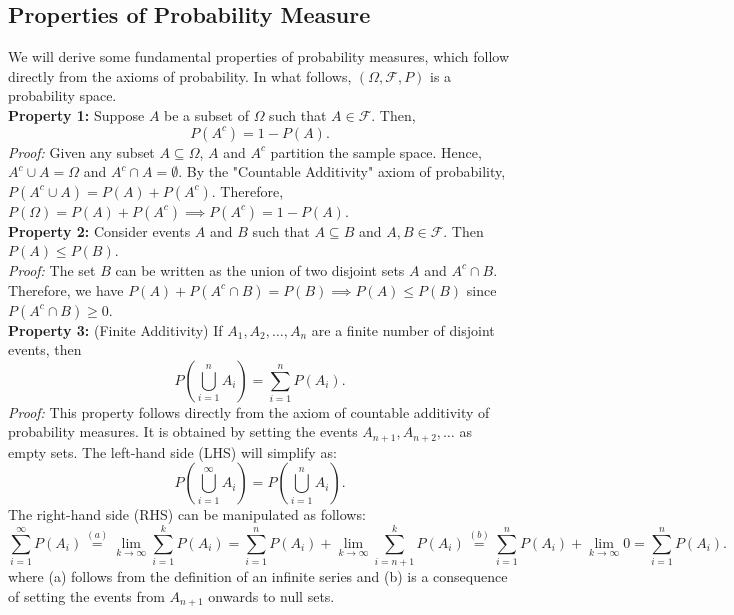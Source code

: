 \subsection{Properties of Probability Measure}

We will derive some fundamental properties of probability measures, which follow directly from the axioms of probability. In what follows, \((\Omega, \mathcal{F}, P)\) is a probability space. \\

\textbf{Property 1:} Suppose \( A \) be a subset of \(\Omega\) such that \( A \in \mathcal{F} \). Then,
\[
P(A^c) = 1 - P(A). 
\]
\textit{Proof:} Given any subset \( A \subseteq \Omega \), \( A \) and \( A^c \) partition the sample space. Hence, \( A^c \cup A = \Omega \) and \( A^c \cap A = \emptyset \). By the "Countable Additivity" axiom of probability, \( P(A^c \cup A) = P(A) + P(A^c) \). Therefore, \( P(\Omega) = P(A) + P(A^c) \implies P(A^c) = 1 - P(A) \).\\

\textbf{Property 2:} Consider events \( A \) and \( B \) such that \( A \subseteq B \) and \( A, B \in \mathcal{F} \). Then \( P(A) \leq P(B) \).\\

\textit{Proof:} The set \( B \) can be written as the union of two disjoint sets \( A \) and \( A^c \cap B \). Therefore, we have \( P(A) + P(A^c \cap B) = P(B) \implies P(A) \leq P(B) \) since \( P(A^c \cap B) \geq 0 \).\\

\textbf{Property 3:} (Finite Additivity) If \( A_1, A_2, \ldots, A_n \) are a finite number of disjoint events, then
\[
P\left(\bigcup_{i=1}^{n} A_i\right) = \sum_{i=1}^{n} P(A_i). 
\]
\textit{Proof:} This property follows directly from the axiom of countable additivity of probability measures. It is obtained by setting the events \( A_{n+1}, A_{n+2}, \ldots \) as empty sets. The left-hand side (LHS) will simplify as:
\[
P\left(\bigcup_{i=1}^{\infty} A_i\right) = P\left(\bigcup_{i=1}^{n} A_i\right).
\]
The right-hand side (RHS) can be manipulated as follows:
\[
\sum_{i=1}^{\infty} P(A_i) \overset{(a)}{=} \lim_{k \to \infty} \sum_{i=1}^{k} P(A_i) = \sum_{i=1}^{n} P(A_i) + \lim_{k \to \infty} \sum_{i=n+1}^{k} P(A_i) \overset{(b)}{=} \sum_{i=1}^{n} P(A_i) + \lim_{k \to \infty} 0 = \sum_{i=1}^{n} P(A_i).
\]
where (a) follows from the definition of an infinite series and (b) is a consequence of setting the events from \( A_{n+1} \) onwards to null sets.\\

